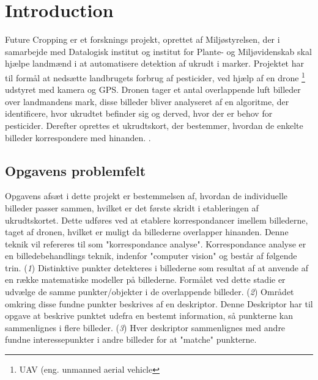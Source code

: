 \chapter{Introduction} \label{sec:intro}
Future Cropping er et forsknings projekt, oprettet af Miljøstyrelsen, der i samarbejde med Datalogisk institut og institut for Plante- og Miljøvidenskab skal hjælpe landmænd i at automatisere detektion af ukrudt i marker. Projektet har til formål at nedsætte landbrugets forbrug af pesticider, ved hjælp af en drone \footnote{UAV (eng. unmanned aerial vehicle} udstyret med kamera og GPS. Dronen tager et antal overlappende luft billeder over landmandens mark, disse billeder bliver analyseret af en algoritme, der identificere, hvor ukrudtet befinder sig og derved, hvor der er behov for pesticider. Derefter oprettes et ukrudtskort, der bestemmer, hvordan de enkelte billeder korrespondere med hinanden. \cite{drone}.
\section{Opgavens problemfelt} \label{subsec:felt}
Opgavens afsæt i dette projekt er bestemmelsen af, hvordan de individuelle billeder passer sammen, hvilket er det første skridt i etableringen af ukrudtskortet. Dette udføres ved at etablere korrespondancer imellem billederne, taget af dronen, hvilket er muligt da billederne overlapper hinanden. Denne teknik vil refereres til som "korrespondance analyse". Korrespondance analyse er en billedebehandlings teknik, indenfor "computer vision" og består af følgende trin. (\textit{1}) Distinktive punkter detekteres i billederne som resultat af at anvende af en række matematiske modeller på billederne. Formålet ved dette stadie er udvælge de samme punkter/objekter i de overlappende billeder. (\textit{2}) Området omkring disse fundne punkter beskrives af en deskriptor. Denne Deskriptor har til opgave at beskrive punktet udefra en bestemt information, så punkterne kan sammenlignes i flere billeder. (\textit{3}) Hver deskriptor sammenlignes med andre fundne interessepunkter i andre billeder for at "matche" punkterne.

